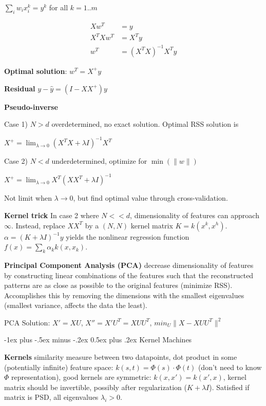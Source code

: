 \documentclass[10pt,landscape]{article}
\makeatletter
\renewcommand{\section}{\@startsection{section}{1}{0mm}%
                                {-1ex plus -.5ex minus -.2ex}%
                                {0.5ex plus .2ex}%
                                {\normalfont\large\bfseries}}
\makeatother
\begin{document}
\begin{multicols}{3}
$\sum_i w_i x^k_i = y^k$ for all $k=1..m$

\begin{align*}
Xw^T &= y \\
X^T X w^T &= X^T y \\
w^T &= (X^T X)^{-1} X^T y
\end{align*}

\textbf{Optimal solution}: $w^T = X^+ y$

\textbf{Residual} $y-\hat{y} = (I-XX^+)y$

\textbf{Pseudo-inverse}

Case 1) $N > d$ overdetermined, no exact solution. Optimal RSS solution is

$X^+ = \lim_{\lambda \rightarrow 0} (X^T X + \lambda I)^{-1} X^T$

Case 2) $N < d$ underdetermined, optimize for $\min(\lVert w \rVert)$

$X^+ = \lim_{\lambda \rightarrow 0} X^T(XX^T + \lambda I)^{-1}$

Not limit when $\lambda \rightarrow 0$, but find optimal value through cross-validation.

\textbf{Kernel trick} In case 2 where $N << d$, dimensionality of features can approach $\infty$. Instead, replace $XX^T$ by a $(N, N)$ kernel matrix $K = k(x^k, x^h)$. $\alpha = (K + \lambda I)^{-1} y$ yields the nonlinear regression function $f(x) = \sum_k \alpha_k k(x, x_k)$.

\textbf{Principal Component Analysis (PCA)} decrease dimensionality of features by constructing linear combinations of the features such that the reconstructed patterns are as close as possible to the original features (minimize RSS). Accomplishes this by removing the dimensions with the smallest eigenvalues (smallest variance, affects the data the least).

PCA Solution: $X' = XU$, $X'' = X' U^T = XUU^T$, $min_U \lVert X - XUU^T \rVert^2$


\section{Kernel Machines}

\textbf{Kernels} similarity measure between two datapoints, dot product in some (potentially infinite) feature space: $k(s, t) = \Phi(s) \cdot \Phi(t)$ (don't need to know $\Phi$ representation), good kernels are symmetric: $k(x, x') = k(x', x)$, kernel matrix should be invertible, possibly after regularization ($K+\lambda I$). Satisfied if matrix is PSD, all eigenvalues $\lambda_i > 0$.


\end{multicols}
\end{document}
